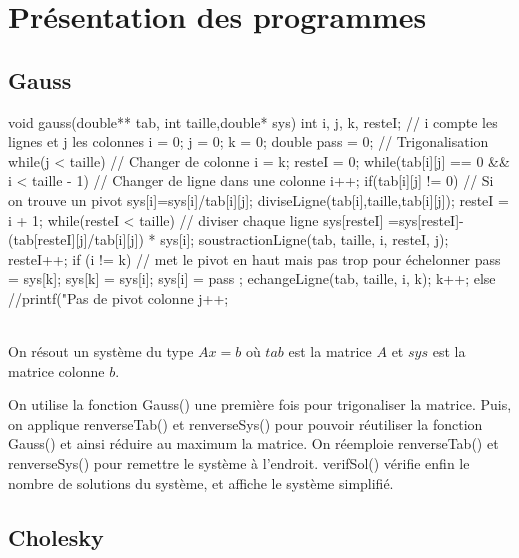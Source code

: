 \documentclass{article}
\begin{document}
\section{Présentation des programmes}

\subsection{Gauss}

\begin{boxedverbatim}
void gauss(double** tab, int taille,double* sys){
  int i, j, k, resteI; // i compte les lignes et j les colonnes
  i = 0;
  j = 0;
  k = 0;
  double pass = 0;
  // Trigonalisation
  while(j < taille){ // Changer de colonne
    i = k;
    resteI = 0;
    while(tab[i][j] == 0  && i < taille - 1){ // Changer de ligne dans une colonne
      i++;
    }
    if(tab[i][j] != 0){ // Si on trouve un pivot
      sys[i]=sys[i]/tab[i][j];
      diviseLigne(tab[i],taille,tab[i][j]);
      resteI = i + 1;
      while(resteI < taille){ // diviser chaque ligne
        sys[resteI] =sys[resteI]- (tab[resteI][j]/tab[i][j]) * sys[i];
        soustractionLigne(tab, taille, i, resteI, j);
        resteI++;
      }
      if (i != k){ // met le pivot en haut mais pas trop pour échelonner
        pass = sys[k];
        sys[k] = sys[i];
        sys[i] = pass ;
        echangeLigne(tab, taille, i, k);
      }
      k++;
    }
    else{
      //printf("Pas de pivot colonne %
    }
    j++;
  }
}
\end{boxedverbatim}
\\
On résout un système du type $Ax=b$ où $tab$ est la matrice $A$ et $sys$ est la matrice colonne $b$.


On utilise la fonction Gauss() une première fois pour trigonaliser la matrice. Puis, on applique renverseTab() et renverseSys() pour pouvoir réutiliser la fonction Gauss() et ainsi réduire au maximum la matrice. On réemploie renverseTab() et renverseSys() pour remettre le système à l'endroit.
verifSol() vérifie enfin le nombre de solutions du système, et affiche le système simplifié.


\subsection{Cholesky}
\end{document}
